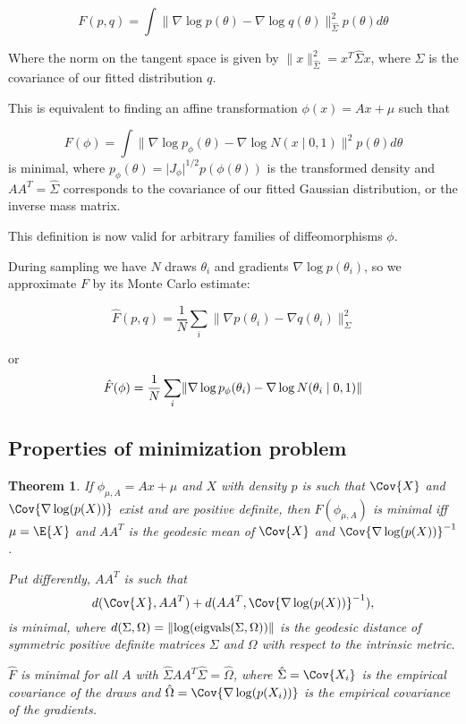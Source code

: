 \documentclass{scrartcl}
\DeclareMathOperator{\eigvals}{eigvals}
\DeclarePairedDelimiter{\norm}{\lVert}{\rVert}
\newtheorem{thm}{Theorem}
\begin{document}
$$
  F(p, q)
    = \int \lVert \nabla \log p(\theta)
      - \nabla \log q(\theta)\rVert_{\hat\Sigma}^2 p(\theta)d\theta
$$

Where the norm on the tangent space is given by $\lVert x\lVert_{\hat\Sigma}^2
= x^T \hat\Sigma x$, where $\hat\Sigma$ is the covariance of our fitted
distribution $q$.

This is equivalent to finding an affine transformation $\phi(x) = Ax + \mu$
such that

\[
F(\phi)
  = \int \lVert \nabla \log p_\phi(\theta)
    - \nabla \log N(x \mid 0, 1) \rVert^2 p(\theta) d\theta
\]
is minimal, where $p_\phi(\theta) = \lvert J_\phi\rvert^{1/2} p(\phi(\theta))$
is the transformed density and $AA^T = \hat\Sigma$ corresponds to the
covariance of our fitted Gaussian distribution, or the inverse mass matrix.

This definition is now valid for arbitrary families of diffeomorphisms $\phi$.

During sampling we have $N$ draws $\theta_i$ and gradients $\nabla \log
p(\theta_i)$, so we approximate $F$ by its Monte Carlo estimate:

\[
\hat{F}(p, q)
  = \frac{1}{N} \sum_i \lVert \nabla p(\theta_i)
    - \nabla q(\theta_i)\rVert^2_\Sigma
\]

or
\[
\hat{F}(\phi)
  = \frac{1}{N} \sum_i
    \norm{\nabla \log p_\phi(\theta_i) - \nabla \log N(\theta_i \mid 0, 1)}
\]

\subsection{Properties of minimization problem}

\begin{thm}
If $\phi_{\mu, A} = Ax + \mu$ and $X$ with density $p$ is such that $\Cov{X}$
and $\Cov{\nabla \log(p(X))}$ exist and are positive definite, then
$F(\phi_{\mu, A})$ is minimal iff $\mu = \E{X}$ and $AA^T$ is the
geodesic mean of $\Cov{X}$ and $\Cov{\nabla \log(p(X))}^{-1}$.

Put differently, $AA^T$ is such that
\[
d(\Cov{X}, AA^T) + d(AA^T, \Cov{\nabla\log(p(X))}^{-1}),
\]
is minimal, where $d(\Sigma, \Omega) = \norm{\log(\eigvals(\Sigma, \Omega))}$
is the geodesic distance of symmetric positive definite matrices
$\Sigma$ and $\Omega$ with respect to the intrinsic metric.

$\hat{F}$ is minimal for all $A$ with $\hat{\Sigma} AA^T\hat{\Sigma} =
\hat{\Omega}$, where $\hat{\Sigma} = \Cov{X_i}$ is the empirical
covariance of the draws and $\hat{\Omega} = \Cov{\nabla \log(p(X_i))}$ is
the empirical covariance of the gradients.
\end{thm}
\end{document}
